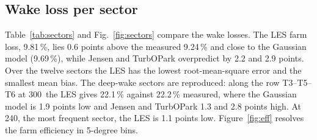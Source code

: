 \documentclass[11pt,a4paper]{article}
\begin{document}
\subsection{Wake loss per sector}

Table~\ref{tab:sectors} and Fig.~\ref{fig:sectors} compare the wake losses. The LES farm loss, 9.81\,\%, lies
0.6 points above the measured 9.24\,\% and close to the Gaussian model (9.69\,\%), while Jensen and TurbOPark
overpredict by 2.2 and 2.9 points. Over the twelve sectors the LES has the lowest root-mean-square error and the
smallest mean bias. The deep-wake sectors are reproduced: along the row T3--T5--T6 at 300\textdegree\ the LES
gives 22.1\,\% against 22.2\,\% measured, where the Gaussian model is 1.9 points low and Jensen and TurbOPark 1.3
and 2.8 points high. At 240\textdegree, the most frequent sector, the LES is 1.1 points low. Figure~\ref{fig:eff}
resolves the farm efficiency in 5-degree bins.
\end{document}
